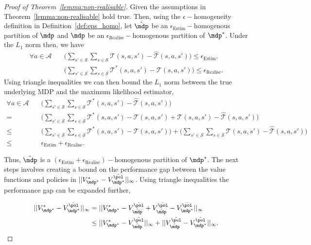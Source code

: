\begin{proof}[Proof of Theorem~\ref{lemma:non-realisable}]
Given the assumptions in Theorem~\ref{lemma:non-realisable} hold true. Then, using the $\epsilon-$homogeneity definition in Definition~\ref{def:eps_homo}, let $\hat{\mdp}$ be an $\epsilon_{\mathrm{Estim}}-$homogenous partition of $\mdp$ and $\mdp$ be an $\epsilon_{\mathrm{Realise}}-$homogenous partition of $\mdp^*$. Under the $L_1$ norm then, we have     
    \begin{align}
        \forall a \in \mathcal{A} \quad &\Big(\sum_{s' \in \mathcal{S}} \sum_{s\in\mathcal{S}}\mathcal{T}(s, a, s')-\hat{\mathcal{T}}(s, a, s')\Big) \leq \epsilon_{\mathrm{Estim}},\\
         &\Big(\sum_{s' \in \mathcal{S}} \sum_{s\in\mathcal{S}}\mathcal{T}^*(s, a, s')-\mathcal{T}(s, a, s')\Big) \leq \epsilon_{\mathrm{Realise}}.
    \end{align}
Using triangle inequalities we can then bound the $L_1$ norm between the true underlying MDP and the maximum likelihood estimator,
\begin{align}
     \forall a \in \mathcal{A} \quad &\Big(\sum_{s' \in \mathcal{S}} \sum_{s\in\mathcal{S}}\mathcal{T}^*(s, a, s')-\hat{\mathcal{T}}(s, a, s')\Big)\\
    = \, &\Big(\sum_{s' \in \mathcal{S}} \sum_{s\in\mathcal{S}}\mathcal{T}^*(s, a, s')-\mathcal{T}(s,a,s')+\mathcal{T}(s,a,s')-\hat{\mathcal{T}}(s, a, s')\Big)\\
    \leq \, &\Big(\sum_{s' \in \mathcal{S}} \sum_{s\in\mathcal{S}}\mathcal{T}^*(s, a, s')-\mathcal{T}(s,a,s')\Big) +\Big(\sum_{s' \in \mathcal{S}} \sum_{s\in\mathcal{S}}\mathcal{T}(s, a, s')-\hat{\mathcal{T}}(s,a,s')\Big)\\ \leq \, &\epsilon_{\mathrm{Estim}}+\epsilon_{\mathrm{Realise}}.
\end{align}

Thus, $\hat{\mdp}$ is a $(\epsilon_{\mathrm{Estim}}+\epsilon_{\mathrm{Realise}})-$homogenous partition of $\mdp^*$. The next steps involves creating a bound on the performance gap between the value functions and policies in $||V_{{\mdp^*}}^{*}-V_{{\mdp^*}}^{\hat{\pol}}||_\infty$. Using triangle inequalities the performance gap can be expanded further,

\begin{equation}
\begin{aligned}\label{eq:triangle}
    ||V_{{\mdp^*}}^{*}-V_{{\mdp^*}}^{\hat{\pol}}||_\infty &= ||V_{{\mdp^*}}^{*}-V_{\hat{\mdp}}^{\hat{\pol}}+V_{\hat{\mdp}}^{\hat{\pol}}-V_{{\mdp^*}}^{\hat{\pol}}||_\infty\\
    &\leq ||V_{{\mdp^*}}^{*}-V_{\hat{\mdp}}^{\hat{\pol}}||_\infty+||V_{\hat{\mdp}}^{\hat{\pol}}-V_{{\mdp^*}}^{\hat{\pol}}||_\infty.
\end{aligned}
\end{equation}


\end{proof}
